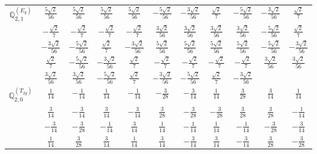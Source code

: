 \documentclass[fleqn,10pt,landscape]{article}
\begin{document}
\begin{itemize}
{\begin{center}
\begin{longtable}{ccccccccccc}
$\mathbb{Q}_{2,1}^{(E_{g})}$ & $ \frac{5 \sqrt{2}}{56} $ & $ \frac{5 \sqrt{2}}{56} $ & $ \frac{5 \sqrt{2}}{56} $ & $ \frac{5 \sqrt{2}}{56} $ & $ - \frac{5 \sqrt{2}}{56} $ & $ - \frac{3 \sqrt{2}}{56} $ & $ \frac{\sqrt{2}}{7} $ & $ - \frac{5 \sqrt{2}}{56} $ & $ - \frac{3 \sqrt{2}}{56} $ & $ \frac{\sqrt{2}}{7} $ \\
& $ - \frac{\sqrt{2}}{7} $ & $ - \frac{\sqrt{2}}{7} $ & $ - \frac{\sqrt{2}}{7} $ & $ - \frac{\sqrt{2}}{7} $ & $ \frac{3 \sqrt{2}}{56} $ & $ \frac{3 \sqrt{2}}{56} $ & $ \frac{3 \sqrt{2}}{56} $ & $ \frac{3 \sqrt{2}}{56} $ & $ - \frac{5 \sqrt{2}}{56} $ & $ \frac{\sqrt{2}}{7} $ \\
& $ - \frac{3 \sqrt{2}}{56} $ & $ - \frac{5 \sqrt{2}}{56} $ & $ \frac{\sqrt{2}}{7} $ & $ - \frac{3 \sqrt{2}}{56} $ & $ \frac{5 \sqrt{2}}{56} $ & $ \frac{5 \sqrt{2}}{56} $ & $ \frac{5 \sqrt{2}}{56} $ & $ \frac{5 \sqrt{2}}{56} $ & $ - \frac{5 \sqrt{2}}{56} $ & $ - \frac{3 \sqrt{2}}{56} $ \\
& $ \frac{\sqrt{2}}{7} $ & $ - \frac{5 \sqrt{2}}{56} $ & $ - \frac{3 \sqrt{2}}{56} $ & $ \frac{\sqrt{2}}{7} $ & $ - \frac{\sqrt{2}}{7} $ & $ - \frac{\sqrt{2}}{7} $ & $ - \frac{\sqrt{2}}{7} $ & $ - \frac{\sqrt{2}}{7} $ & $ \frac{3 \sqrt{2}}{56} $ & $ \frac{3 \sqrt{2}}{56} $ \\
& $ \frac{3 \sqrt{2}}{56} $ & $ \frac{3 \sqrt{2}}{56} $ & $ - \frac{5 \sqrt{2}}{56} $ & $ \frac{\sqrt{2}}{7} $ & $ - \frac{3 \sqrt{2}}{56} $ & $ - \frac{5 \sqrt{2}}{56} $ & $ \frac{\sqrt{2}}{7} $ & $ - \frac{3 \sqrt{2}}{56} $ & $  $ & $  $ \\ \hline
$\mathbb{Q}_{2,0}^{(T_{2g})}$ & $ \frac{1}{14} $ & $ - \frac{1}{14} $ & $ \frac{1}{14} $ & $ - \frac{1}{14} $ & $ - \frac{3}{28} $ & $ - \frac{3}{14} $ & $ \frac{1}{14} $ & $ \frac{3}{28} $ & $ \frac{3}{14} $ & $ \frac{1}{14} $ \\
& $ \frac{3}{14} $ & $ - \frac{3}{14} $ & $ \frac{3}{14} $ & $ - \frac{3}{14} $ & $ \frac{3}{28} $ & $ - \frac{3}{28} $ & $ - \frac{3}{28} $ & $ \frac{3}{28} $ & $ \frac{3}{28} $ & $ - \frac{1}{14} $ \\
& $ - \frac{3}{14} $ & $ - \frac{3}{28} $ & $ - \frac{1}{14} $ & $ \frac{3}{14} $ & $ \frac{1}{14} $ & $ - \frac{1}{14} $ & $ \frac{1}{14} $ & $ - \frac{1}{14} $ & $ - \frac{3}{28} $ & $ - \frac{3}{14} $ \\
& $ \frac{1}{14} $ & $ \frac{3}{28} $ & $ \frac{3}{14} $ & $ \frac{1}{14} $ & $ \frac{3}{14} $ & $ - \frac{3}{14} $ & $ \frac{3}{14} $ & $ - \frac{3}{14} $ & $ \frac{3}{28} $ & $ - \frac{3}{28} $ \\

\end{longtable}
\end{center}}
\end{itemize}
\end{document}
